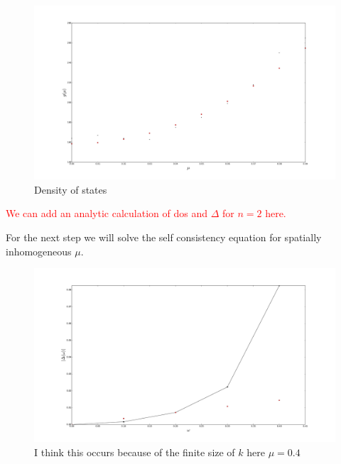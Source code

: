 \documentclass[%
 preprint,
 amsmath,amssymb,
 aps,
]{revtex4-1}
\begin{document}
\begin{figure}[h!]
\begin{center}
\includegraphics[width=1\textwidth]{dos_anl_vs_num.pdf}
\caption{Density of states}
\end{center}
\end{figure}
\textcolor{red}{We can add an analytic calculation of dos and $\Delta$ for $n=2$ here.}

For the next step we will solve the self consistency equation for spatially inhomogeneous $\mu$.
\begin{figure}[h!]
\begin{center}
\includegraphics[width=1\textwidth]{debye_vs_delta.pdf}
\caption{I think this  occurs because of the finite size of $k$ here $\mu=0.4$}
\end{center}
\end{figure}
\end{document}
